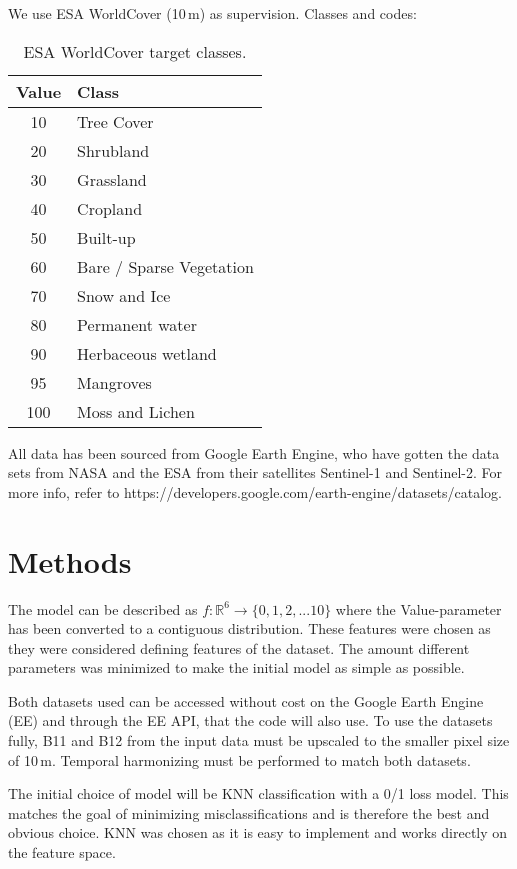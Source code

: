 \documentclass{article}
\begin{document}
We use ESA WorldCover (10\,m) as supervision. Classes and codes:

\begin{table}[h]
    \centering
    \begin{tabular}{|c|l|}\hline
        Value & Class \\\hline
          10 & Tree Cover\\\hline
          20 & Shrubland\\\hline
          30 & Grassland\\\hline
          40 & Cropland\\\hline
          50 & Built-up\\\hline
          60 & Bare / Sparse Vegetation\\\hline
          70 & Snow and Ice\\\hline
          80 & Permanent water\\\hline
          90 & Herbaceous wetland\\\hline
          95 & Mangroves\\\hline
          100 & Moss and Lichen\\\hline
    \end{tabular}
    \caption{ESA WorldCover target classes.}
    \label{tab:worldcover}
\end{table}

All data has been sourced from Google Earth Engine, who have gotten the data sets from NASA and the ESA from their satellites Sentinel-1 and Sentinel-2. For more info, refer to https://developers.google.com/earth-engine/datasets/catalog.

\section{Methods}
The model can be described as $f:\mathbb{R}^{6}\rightarrow \{0,1,2,... 10\}$ where the Value-parameter has been converted to a contiguous distribution. These features were chosen as they were considered defining features of the dataset. The amount different parameters was minimized to make the initial model as simple as possible. 

Both datasets used can be accessed without cost on the Google Earth Engine (EE) and through the EE API, that the code will also use. To use the datasets fully, B11 and B12 from the input data must be upscaled to the smaller pixel size of 10\,m. Temporal harmonizing must be performed to match both datasets. 

The initial choice of model will be KNN classification with a 0/1 loss model. This matches the goal of minimizing misclassifications and is therefore the best and obvious choice. KNN was chosen as it is easy to implement and works directly on the feature space.
\end{document}
